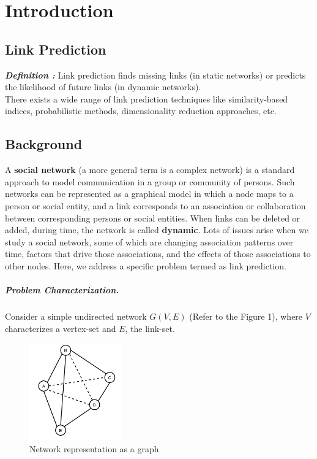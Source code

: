 \chapter{Introduction}

\section{\texorpdfstring{Link Prediction }{Link
      Prediction}} \label{link-prediction-mag}

\textbf{\emph{Definition :}} Link prediction finds missing links
(in static networks) or predicts the likelihood of future links (in
dynamic networks).\\

There exists a wide range of link prediction techniques like
similarity-based indices, probabilistic methods, dimensionality
reduction approaches, etc.

\section{Background}

A \textbf{social network} (a more general term is a complex network) is a
standard approach to model communication in a group or community of persons.
Such networks can be represented as a graphical model in which a node maps to a
person or social entity, and a link corresponds to an association or
collaboration between corresponding persons or social entities. When links can
be deleted or added, during time, the network is called \textbf{dynamic}. Lots
of issues arise when we study a social network, some of which are changing
association patterns over time, factors that drive those associations, and the
effects of those associations to other nodes. Here, we address a specific
problem termed as link prediction.

\paragraph{Problem Characterization.}\label{problem-characterization}
Consider a simple undirected network \(G(V, E)\) (Refer to the Figure 1), where
\(V\) characterizes a vertex-set and \(E\), the link-set.

\begin{figure}[H]
    \centering
    \includegraphics[width=4cm, keepaspectratio]{capitoli/intro/imgs/img1.png}
    \caption{Network representation as a graph}
\end{figure}

